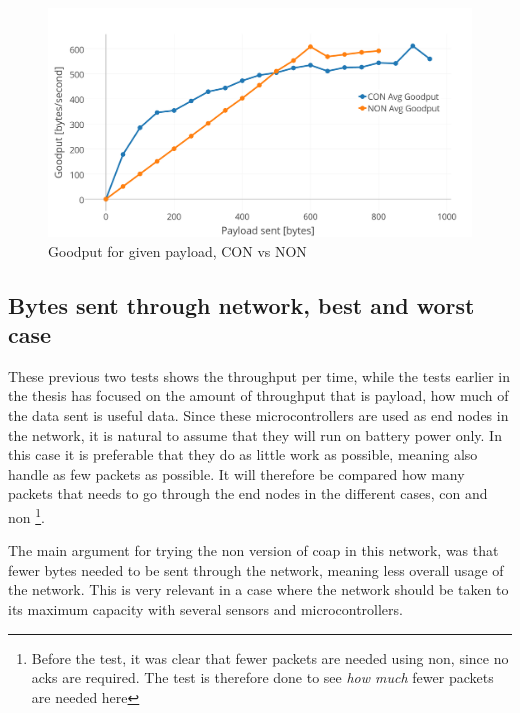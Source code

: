 \begin{figure}[ht]
    \centering
    \includegraphics[width=1.0\textwidth]{payloadGoodput_CONNON.png}    
    \caption{Goodput for given payload, CON vs NON}
    \label{fig:payloadGoodput_CONNON}
\end{figure}
 



\newpage
\subsection{Bytes sent through network, best and worst case}

\noindent These previous two tests shows the throughput per time, while the tests earlier in the thesis has focused on the amount of throughput that is \gls{payload}, how much of the data sent is useful data. Since these \glspl{microcontroller} are used as end nodes in the network, it is natural to assume that they will run on battery power only. In this case it is preferable that they do as little work as possible, meaning also handle as few packets as possible. It will therefore be compared how many packets that needs to go through the end nodes in the different cases, \gls{con} and \gls{non} \footnote{Before the test, it was clear that fewer packets are needed using \gls{non}, since no \glspl{ack} are required. The test is therefore done to see \textit{how much} fewer packets are needed here}.

\noindent The main argument for trying the \gls{non} version of \gls{coap} in this network, was that fewer bytes needed to be sent through the network, meaning less overall usage of the network. This is very relevant in a case where the network should be taken to its maximum capacity with several sensors and \glspl{microcontroller}. 


